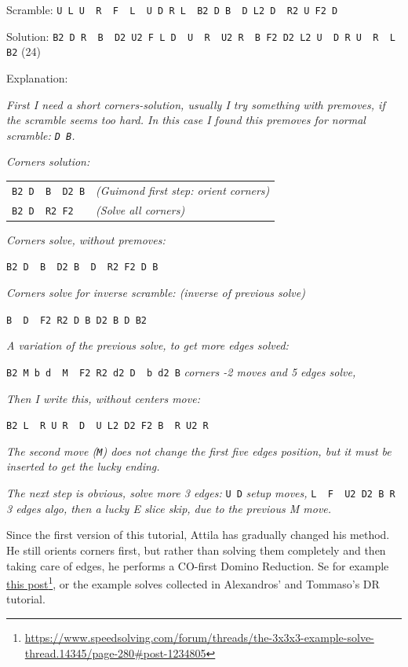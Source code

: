 \documentclass[11pt,a4paper]{book}
\newcommand{\p}{\textquotesingle}
\newcommand{\m}{\texttt}
\newcommand{\ps}{\p\,\,}
\begin{document}
\begin{framed}
Scramble: \m{U L U\ps R\ps F\ps L\ps U D R L\ps B2 D B\ps D L2 D\ps R2 U F2 D}

\begin{center}

\end{center}

Solution: \m{B2 D R\ps B\ps D2 U2 F L D\ps U\ps R\ps U2 R\ps B F2 D2 L2 U\ps D R U\ps R\ps L B2} (24)

\bigskip
Explanation:
\begin{center}
\emph{First I need a short corners-solution, usually I try something with premoves, if the scramble seems too hard. In this case I found this premoves for normal scramble: \m{D B}.}
\end{center}
\emph{Corners solution:}
\begin{center}
\begin{tabular}{ll}
\m{B2 D\ps B\ps D2 B} & \emph{(Guimond first step: orient corners)}\\
\m{B2 D\ps R2 F2} & \emph{(Solve all corners)}
\end{tabular}
\end{center}
\emph{Corners solve, without premoves:}
\begin{center}
\m{B2 D\ps B\ps D2 B\ps D\ps R2 F2 D B}
\end{center}
\emph{Corners solve for inverse scramble: (inverse of previous solve)}
\begin{center}
\m{B\ps D\ps F2 R2 D B D2 B D B2}
\end{center}
\emph{A variation of the previous solve, to get more edges solved:}
\begin{center}
\m{B2 M b d\ps M\ps F2 R2 d2 D\ps b d2 B} \emph{corners -2 moves and 5 edges solve,}
\end{center}
\emph{Then I write this, without centers move:}
\begin{center}
\m{B2 L\ps R U R\ps D\ps U L2 D2 F2 B\ps R U2 R}
\end{center}

\emph{The second move (\m M) does not change the first five edges position, but it must be inserted to get the lucky ending.}

\emph{The next step is obvious, solve more 3 edges:} \m{U D} \emph{setup moves,} \m{L\ps F\ps U2 D2 B R} \emph{3 edges algo, then a lucky E slice skip, due to the previous M move.}
\end{framed}

Since the first version of this tutorial, Attila has gradually changed his method. He still orients corners first, but rather than solving them completely and then taking care of edges, he performs a CO-first Domino Reduction. Se for example \href{https://www.speedsolving.com/forum/threads/the-3x3x3-example-solve-thread.14345/page-280\#post-1234805}{this post}\footnote{\url{https://www.speedsolving.com/forum/threads/the-3x3x3-example-solve-thread.14345/page-280\#post-1234805}}, or the example solves collected in Alexandros' and Tommaso's DR tutorial.
\end{document}
